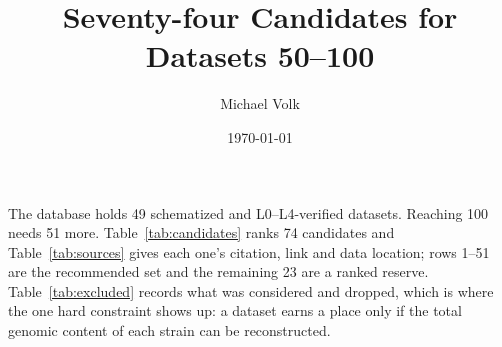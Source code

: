 \documentclass[10pt,a4paper]{article}
\title{\vspace{-1.5em}Seventy-four Candidates for Datasets 50--100}
\author{Michael Volk}
\date{\today}
\begin{document}
\maketitle
\thispagestyle{empty}

\noindent
The database holds 49 schematized and L0--L4-verified 
datasets. Reaching 100 needs 51 more. Table~\ref{tab:candidates} ranks 74 candidates and
Table~\ref{tab:sources} gives each one's citation, link and data location; rows 1--51 are
the recommended set and the remaining 23 are a ranked reserve. Table~\ref{tab:excluded}
records what was considered and dropped, which is where the one hard constraint shows up:
a dataset earns a place only if the total genomic content of each strain can be
reconstructed.

\vspace{0.5em}
\tccontents
\clearpage






\end{document}
